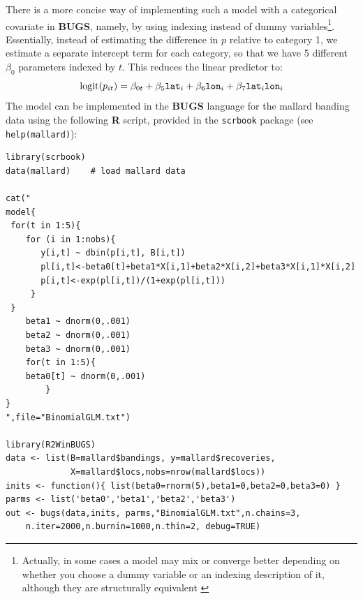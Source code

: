 There is a more concise way of implementing such a model with a
categorical covariate in {\bf BUGS}, namely, by using indexing instead
of dummy variables\footnote{Actually, in some cases a model may mix or
  converge better depending on whether you choose a dummy variable or
  an indexing description of it, although they are structurally
  equivalent \citep{kery:2010}}. Essentially, instead of estimating
the difference in $p$ relative to category 1, we estimate a separate
intercept term for each category, so that we have 5 different $\beta_0$
parameters indexed by $t$. This reduces the linear predictor to:
\[
\mbox{logit}(p_{it}) = \beta_{0t} +  \beta_5 \mbox{\tt lat}_i + \beta_6
\mbox{\tt lon}_i + \beta_7 \mbox{\tt lat}_i \mbox{\tt lon}_i
\]
The model can be implemented in the {\bf BUGS} language for the
mallard banding data using the following {\bf R} script, provided in
the \mbox{\tt scrbook} package (see \mbox{\tt help(mallard)}): 
{\small
\begin{verbatim}
library(scrbook)
data(mallard)    # load mallard data

cat("
model{
 for(t in 1:5){
    for (i in 1:nobs){
       y[i,t] ~ dbin(p[i,t], B[i,t])
       pl[i,t]<-beta0[t]+beta1*X[i,1]+beta2*X[i,2]+beta3*X[i,1]*X[i,2]
       p[i,t]<-exp(pl[i,t])/(1+exp(pl[i,t]))
     }
 }
	beta1 ~ dnorm(0,.001)
	beta2 ~ dnorm(0,.001)
	beta3 ~ dnorm(0,.001)
	for(t in 1:5){
 	beta0[t] ~ dnorm(0,.001)  
        }
}
",file="BinomialGLM.txt")

library(R2WinBUGS)
data <- list(B=mallard$bandings, y=mallard$recoveries,
             X=mallard$locs,nobs=nrow(mallard$locs))
inits <- function(){ list(beta0=rnorm(5),beta1=0,beta2=0,beta3=0) }
parms <- list('beta0','beta1','beta2','beta3')
out <- bugs(data,inits, parms,"BinomialGLM.txt",n.chains=3,
 	n.iter=2000,n.burnin=1000,n.thin=2, debug=TRUE)
\end{verbatim}
}

